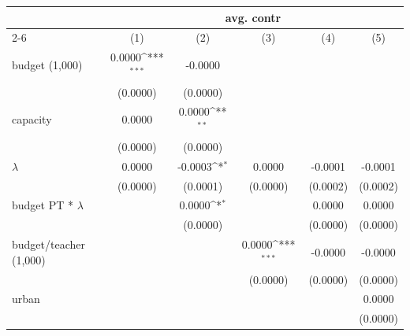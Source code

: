 {
\def\sym#1{\ifmmode^{#1}\else\(^{#1}\)\fi}
\begin{tabular}{l*{5}{c}}
\hline\hline
                    &\multicolumn{5}{c}{avg. contr}                                                                               \\\cmidrule(lr){2-6}
                    &\multicolumn{1}{c}{(1)}         &\multicolumn{1}{c}{(2)}         &\multicolumn{1}{c}{(3)}         &\multicolumn{1}{c}{(4)}         &\multicolumn{1}{c}{(5)}         \\
\hline
budget (1,000)      &      0.0000\sym{***}&     -0.0000         &                     &                     &                     \\
                    &    (0.0000)         &    (0.0000)         &                     &                     &                     \\
[1em]
capacity            &      0.0000         &      0.0000\sym{**} &                     &                     &                     \\
                    &    (0.0000)         &    (0.0000)         &                     &                     &                     \\
[1em]
$\lambda$           &      0.0000         &     -0.0003\sym{*}  &      0.0000         &     -0.0001         &     -0.0001         \\
                    &    (0.0000)         &    (0.0001)         &    (0.0000)         &    (0.0002)         &    (0.0002)         \\
[1em]
budget PT * $\lambda$&                     &      0.0000\sym{*}  &                     &      0.0000         &      0.0000         \\
                    &                     &    (0.0000)         &                     &    (0.0000)         &    (0.0000)         \\
[1em]
budget/teacher (1,000)&                     &                     &      0.0000\sym{***}&     -0.0000         &     -0.0000         \\
                    &                     &                     &    (0.0000)         &    (0.0000)         &    (0.0000)         \\
[1em]
urban               &                     &                     &                     &                     &      0.0000         \\
                    &                     &                     &                     &                     &    (0.0000)         \\

\end{tabular}}
